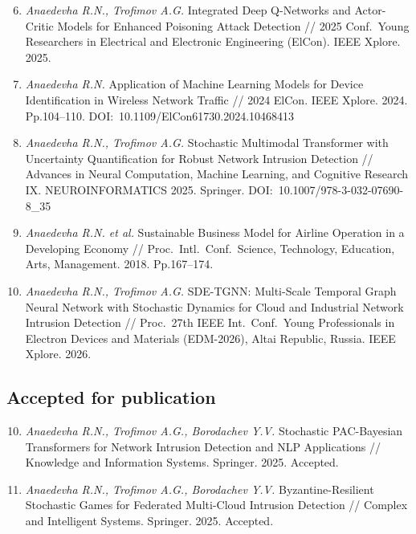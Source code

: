 \documentclass[12pt,a5paper]{article}
\begin{document}
\begin{enumerate}
\setcounter{enumi}{5}
\item \textit{Anaedevha R.N., Trofimov A.G.} Integrated Deep Q-Networks and Actor-Critic Models for Enhanced Poisoning Attack Detection // 2025 Conf.\ Young Researchers in Electrical and Electronic Engineering (ElCon). IEEE Xplore. 2025.

\item \textit{Anaedevha R.N.} Application of Machine Learning Models for Device Identification in Wireless Network Traffic // 2024 ElCon. IEEE Xplore. 2024. Pp.104--110. DOI:~10.1109/ElCon61730.2024.10468413

\item \textit{Anaedevha R.N., Trofimov A.G.} Stochastic Multimodal Transformer with Uncertainty Quantification for Robust Network Intrusion Detection // Advances in Neural Computation, Machine Learning, and Cognitive Research IX. NEUROINFORMATICS 2025. Springer. DOI:~10.1007/978-3-032-07690-8\_35

\item \textit{Anaedevha R.N. et al.} Sustainable Business Model for Airline Operation in a Developing Economy // Proc.\ Intl.\ Conf.\ Science, Technology, Education, Arts, Management. 2018. Pp.167--174.

\item \textit{Anaedevha R.N., Trofimov A.G.} SDE-TGNN: Multi-Scale Temporal Graph Neural Network with Stochastic Dynamics for Cloud and Industrial Network Intrusion Detection // Proc.\ 27th IEEE Int.\ Conf.\ Young Professionals in Electron Devices and Materials (EDM-2026), Altai Republic, Russia. IEEE Xplore. 2026.
\end{enumerate}

\subsection*{Accepted for publication}

\begin{enumerate}
\setcounter{enumi}{9}
\item \textit{Anaedevha R.N., Trofimov A.G., Borodachev Y.V.} Stochastic PAC-Bayesian Transformers for Network Intrusion Detection and NLP Applications // Knowledge and Information Systems. Springer. 2025. Accepted.

\item \textit{Anaedevha R.N., Trofimov A.G., Borodachev Y.V.} Byzantine-Resilient Stochastic Games for Federated Multi-Cloud Intrusion Detection // Complex and Intelligent Systems. Springer. 2025. Accepted.
\end{enumerate}
\end{document}
